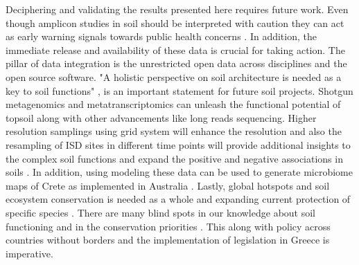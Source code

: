 Deciphering and validating the results presented here requires future work.
Even though amplicon studies in soil should be interpreted with caution \parencite{alteio2021} they 
can act as early warning signals towards public health concerns \parencite{banerjee2023Soil}.
In addition, the immediate release and availability of these data is crucial for 
taking action.
The pillar of data integration is the unrestricted open data across disciplines and 
the open source software.
"A holistic perspective on soil architecture is needed as a key to soil functions" \parencite{philippot2024the-interplay}, is 
an important statement for future soil projects.
Shotgun metagenomics and metatranscriptomics can unleash the functional potential of
topsoil along with other advancements like long reads sequencing. Higher resolution
samplings using grid system will enhance the resolution and also the resampling of
ISD sites in different time points will provide additional insights to the complex soil 
functions and expand the positive and negative associations in soils \parencite{Liu2024}.
In addition, using modeling these data can be used to generate microbiome maps of Crete as 
implemented in Australia \parencite{Peipei2024drivers}.
Lastly, global hotspots \parencite{Guerra2022} and soil ecosystem conservation is needed as 
a whole and expanding current protection of specific species \parencite{guerra2021tracking}.
There are many blind spots in our knowledge about soil functioning and in the conservation
priorities \parencite{farfan2024preliminary}. 
This along with policy \parencite{KONINGER2022} across countries \parencite{Putten2023}
without borders and the implementation of legislation in Greece \parencite{SCHISMENOS2022100035} is 
imperative.


